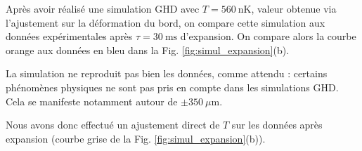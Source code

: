 Après avoir réalisé une simulation GHD avec $T = 560~\mathrm{nK}$, valeur obtenue via l’ajustement sur la déformation du bord, on compare cette simulation aux données expérimentales après $\tau = 30~\mathrm{ms}$ d’expansion. On compare alors la courbe orange aux données en bleu dans la Fig. \ref{fig:simul_expansion}(b). 

La simulation ne reproduit pas bien les données, comme attendu : certains phénomènes physiques ne sont pas pris en compte dans les simulations GHD. Cela se manifeste notamment autour de $\pm 350~\mu\mathrm{m}$. 

Nous avons donc effectué un ajustement direct de $T$ sur les données après expansion (courbe grise de la Fig. \ref{fig:simul_expansion}(b)).

 






